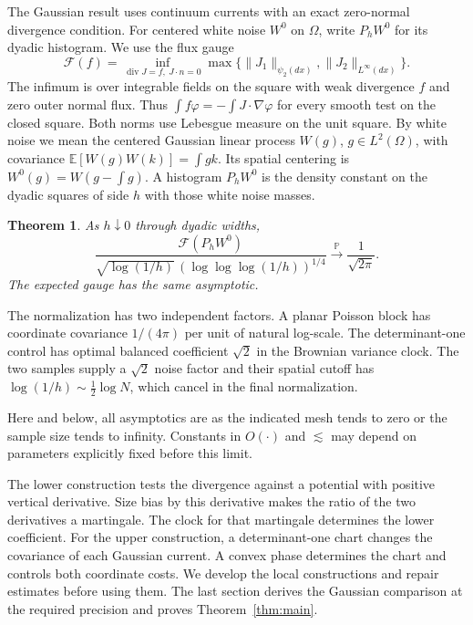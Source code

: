 \documentclass[11pt]{article}
\newtheorem{theorem}{Theorem}
\newcommand{\1}{\mathbf{1}}
\numberwithin{equation}{section}
\begin{document}
The Gaussian result uses continuum currents with an exact
zero-normal divergence condition. For centered white noise
\(W^0\) on \(\Omega\), write \(P_hW^0\) for its dyadic histogram.
We use the flux gauge
\[
 \mathcal F(f)=\inf_{\operatorname{div}J=f,\ J\cdot n=0}
      \max\{\|J_1\|_{\psi_2(dx)},\|J_2\|_{L^\infty(dx)}\}.
\]
The infimum is over integrable fields on the square with weak
divergence \(f\) and zero outer normal flux. Thus
\(\int f\varphi=-\int J\cdot\nabla\varphi\) for every smooth
test on the closed square. Both norms use Lebesgue measure on
the unit square. By white noise we mean the centered Gaussian
linear process \(W(g)\), \(g\in L^2(\Omega)\), with covariance
\(\mathbb E[W(g)W(k)]=\int gk\). Its spatial centering is
\(W^0(g)=W(g-\int g)\). A histogram \(P_hW^0\) is the density
constant on the dyadic squares of side \(h\) with those white
noise masses.

\begin{theorem}\label{thm:gaussian}
As \(h\downarrow0\) through dyadic widths,
\[
 \frac{\mathcal F(P_h W^0)}
 {\sqrt{\log(1/h)}\,(\log\log\log(1/h))^{1/4}}
 \xrightarrow{\mathbb P}\frac{1}{\sqrt{2\pi}} .
\]
The expected gauge has the same asymptotic.
\end{theorem}

The normalization has two independent factors. A planar
Poisson block has coordinate covariance \(1/(4\pi)\) per
unit of natural log-scale. The determinant-one control
has optimal balanced coefficient \(\sqrt{2}\) in the
Brownian variance clock. The two samples supply a
\(\sqrt{2}\) noise factor and their spatial cutoff has
\(\log(1/h)\sim\tfrac12\log N\), which cancel in the final
normalization.


Here and below, all asymptotics are as the indicated mesh tends to zero
or the sample size tends to infinity. Constants in \(O(\cdot)\) and
\(\lesssim\) may depend on parameters explicitly fixed before this limit.

The lower construction tests the divergence against a potential with
positive vertical derivative. Size bias by this derivative makes the
ratio of the two derivatives a martingale. The clock for that martingale
determines the lower coefficient. For the upper construction, a
determinant-one chart changes the covariance of each Gaussian current.
A convex phase determines the chart and controls both coordinate costs.
We develop the local constructions and repair estimates before using
them. The last section derives the Gaussian comparison at the required
precision and proves Theorem~\ref{thm:main}.
\end{document}
